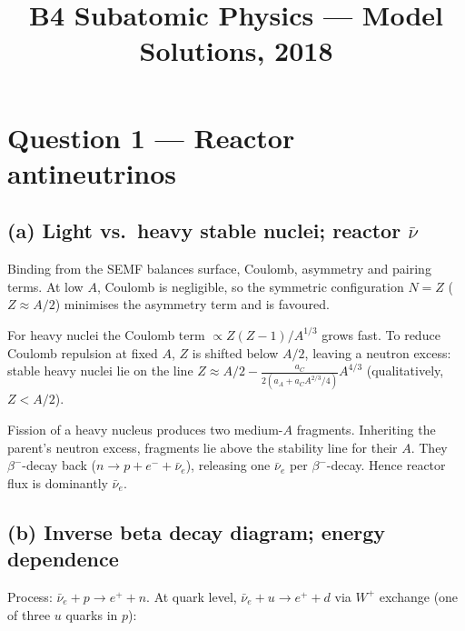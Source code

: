 \documentclass[11pt]{article}
\title{B4 Subatomic Physics --- Model Solutions, 2018}
\author{}
\date{}
\begin{document}
\maketitle

\section*{Question 1 --- Reactor antineutrinos}

\subsection*{(a) Light vs.\ heavy stable nuclei; reactor $\bar\nu$}

Binding from the SEMF balances surface, Coulomb, asymmetry and pairing terms. At low $A$, Coulomb is negligible, so the symmetric configuration $N=Z$ ($Z\approx A/2$) minimises the asymmetry term and is favoured.

For heavy nuclei the Coulomb term $\propto Z(Z-1)/A^{1/3}$ grows fast. To reduce Coulomb repulsion at fixed $A$, $Z$ is shifted below $A/2$, leaving a neutron excess: stable heavy nuclei lie on the line $Z\approx A/2 - \tfrac{a_C}{2(a_A+a_C A^{2/3}/4)}A^{4/3}$ (qualitatively, $Z<A/2$).

Fission of a heavy nucleus produces two medium-$A$ fragments. Inheriting the parent's neutron excess, fragments lie above the stability line for their $A$. They $\beta^-$-decay back ($n\to p + e^- + \bar\nu_e$), releasing one $\bar\nu_e$ per $\beta^-$-decay. Hence reactor flux is dominantly $\bar\nu_e$.

\subsection*{(b) Inverse beta decay diagram; energy dependence}

Process: $\bar\nu_e + p \to e^+ + n$. At quark level, $\bar\nu_e + u \to e^+ + d$ via $W^+$ exchange (one of three $u$ quarks in $p$):

\begin{center}
\end{center}
\end{document}
